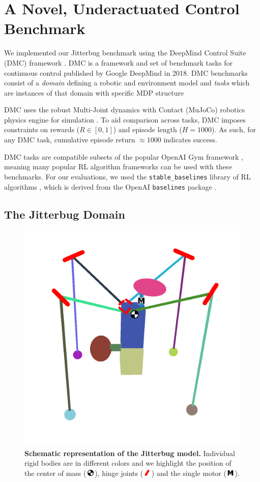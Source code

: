 \documentclass{article}
\newcommand{\com}{\,\includegraphics[width=9pt]{ico-com}\,}
\newcommand{\hinge}{\,\includegraphics[width=9pt]{ico-hinge}\,}
\newcommand{\motor}{\,\includegraphics[width=9pt]{ico-motor}\,}
\begin{document}
\section{A Novel, Underactuated Control Benchmark}

We implemented our Jitterbug benchmark using the DeepMind Control Suite (DMC) framework \cite{Tassa2018DMC}.
DMC is a framework and set of benchmark tasks for continuous control published by Google DeepMind in 2018.
DMC benchmarks consist of a \emph{domain} defining a robotic and environment model and \emph{tasks} which are instances of that domain with specific MDP structure

DMC uses the robust Multi-Joint dynamics with Contact (MuJoCo) robotics physics engine for simulation \cite{Todorov2012MuJoCo}.
To aid comparison across tasks, DMC imposes constraints on rewards ($R \in [0, 1]$) and episode length ($H = 1000$).
As such, for any DMC task, cumulative episode return $\approx 1000$ indicates success.

DMC tasks are compatible subsets of the popular OpenAI Gym framework \cite{Brockman2016Gym}, meaning many popular RL algorithm frameworks can be used with these benchmarks.
For our evaluations, we used the \texttt{stable\_baselines} library of RL algorithms \cite{Hill2018Stable}, which is derived from the OpenAI \texttt{baselines} package \cite{Dhariwal2017Baselines}.

\subsection{The Jitterbug Domain}

\begin{figure}[t]
    \centering
    \includegraphics[width=0.5\linewidth]{fig-jitterbug-parts}\vspace*{-12pt}
    \caption[
        Schematic representation of the Jitterbug model.
        Individual rigid bodies are in different colors and we highlight the position of the center of mass, hinge joints and the single motor.
    ]{
        \textbf{Schematic representation of the Jitterbug model.}
        Individual rigid bodies are in different colors and we highlight the position of the center of mass (\protect\com), hinge joints  (\protect\hinge) and the single motor (\protect\motor).
    }
    \label{fig:parts}
\end{figure}
\end{document}
